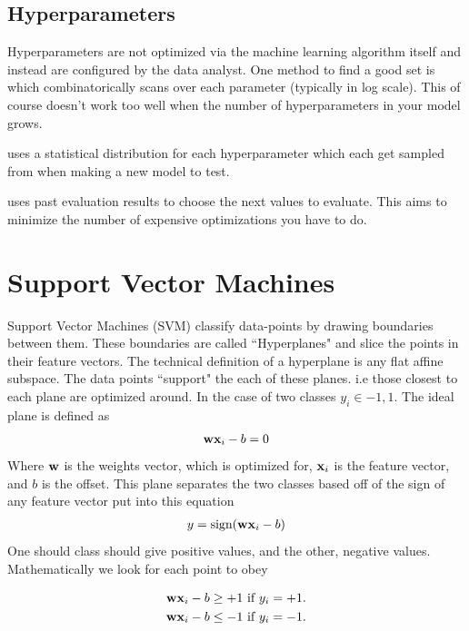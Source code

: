 \subsection{Hyperparameters}

Hyperparameters are not optimized via the machine learning algorithm itself and instead are configured by the data analyst. One method to find a good set is  which combinatorically scans over each parameter (typically in log scale). This of course doesn't work too well when the number of hyperparameters in your model grows. 

 uses a statistical distribution for each hyperparameter which each get sampled from when making a new model to test.

 uses past evaluation results to choose the next values to evaluate. This aims to minimize the number of expensive optimizations you have to do.





\section{Support Vector Machines}\label{sub:svm}
Support Vector Machines (SVM) classify data-points by drawing boundaries between them. These boundaries are called ``Hyperplanes" and slice the points in their feature vectors. The technical definition of a hyperplane is any flat affine subspace. The data points “support" the each of these planes. i.e those closest to each plane are optimized around. In the case of two classes $y_i \in {-1,1}$. The ideal plane is defined as
\begin{align}
		\textbf{wx}_i-b =0
\end{align}
Where $\textbf{w}$ is the weights vector, which is optimized for, $\textbf{x}_i$ is the feature vector, and $b$ is the offset. This plane separates the two classes based off of the sign of any feature vector put into this equation
\begin{align}
	y = \textrm{sign}(\textbf{wx}_i-b)
\end{align}
One should class should give positive values, and the other, negative values. Mathematically we look for each point to obey

\begin{align}
	\textbf{wx}_i-b &\ge +1 ~\textrm{if}~ y_i = +1.  \label{svm_planes_pos}\\
	\textbf{wx}_i-b &\le -1 ~\textrm{if}~ y_i = -1.  \label{svm_planes_neg}
\end{align}

